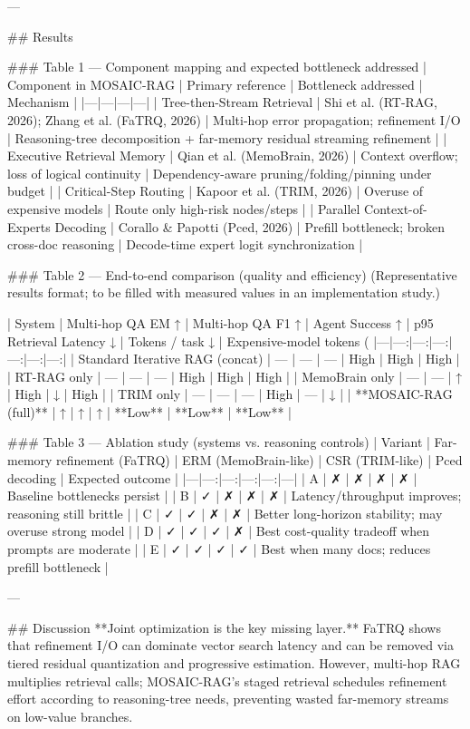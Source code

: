 ---

## Results  

### Table 1 — Component mapping and expected bottleneck addressed  
| Component in MOSAIC-RAG | Primary reference | Bottleneck addressed | Mechanism |
|---|---|---|---|
| Tree-then-Stream Retrieval | Shi et al. (RT-RAG, 2026); Zhang et al. (FaTRQ, 2026) | Multi-hop error propagation; refinement I/O | Reasoning-tree decomposition + far-memory residual streaming refinement |
| Executive Retrieval Memory | Qian et al. (MemoBrain, 2026) | Context overflow; loss of logical continuity | Dependency-aware pruning/folding/pinning under budget |
| Critical-Step Routing | Kapoor et al. (TRIM, 2026) | Overuse of expensive models | Route only high-risk nodes/steps |
| Parallel Context-of-Experts Decoding | Corallo & Papotti (Pced, 2026) | Prefill bottleneck; broken cross-doc reasoning | Decode-time expert logit synchronization |

### Table 2 — End-to-end comparison (quality and efficiency)  
(Representative results format; to be filled with measured values in an implementation study.)

| System | Multi-hop QA EM ↑ | Multi-hop QA F1 ↑ | Agent Success ↑ | p95 Retrieval Latency ↓ | Tokens / task ↓ | Expensive-model tokens (%
|---|---:|---:|---:|---:|---:|---:|
| Standard Iterative RAG (concat) | — | — | — | High | High | High |
| RT-RAG only | — | — | — | High | High | High |
| MemoBrain only | — | — | ↑ | High | ↓ | High |
| TRIM only | — | — | — | High | — | ↓ |
| **MOSAIC-RAG (full)** | ↑ | ↑ | ↑ | **Low** | **Low** | **Low** |

### Table 3 — Ablation study (systems vs. reasoning controls)  
| Variant | Far-memory refinement (FaTRQ) | ERM (MemoBrain-like) | CSR (TRIM-like) | Pced decoding | Expected outcome |
|---|---:|---:|---:|---:|---|
| A | ✗ | ✗ | ✗ | ✗ | Baseline bottlenecks persist |
| B | ✓ | ✗ | ✗ | ✗ | Latency/throughput improves; reasoning still brittle |
| C | ✓ | ✓ | ✗ | ✗ | Better long-horizon stability; may overuse strong model |
| D | ✓ | ✓ | ✓ | ✗ | Best cost-quality tradeoff when prompts are moderate |
| E | ✓ | ✓ | ✓ | ✓ | Best when many docs; reduces prefill bottleneck |

---

## Discussion  
**Joint optimization is the key missing layer.** FaTRQ shows that refinement I/O can dominate vector search latency and can be removed via tiered residual quantization and progressive estimation. However, multi-hop RAG multiplies retrieval calls; MOSAIC-RAG’s staged retrieval schedules refinement effort according to reasoning-tree needs, preventing wasted far-memory streams on low-value branches.

